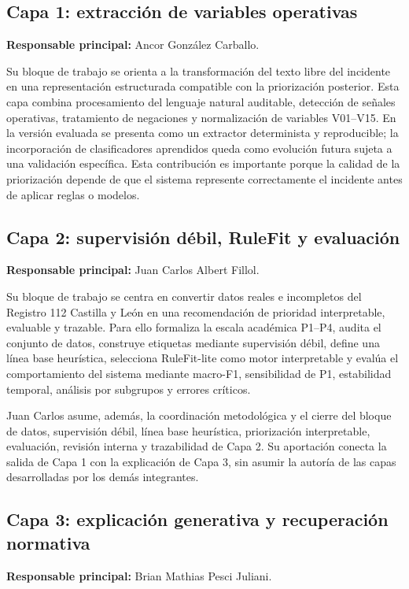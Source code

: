 \subsection{Capa 1: extracción de variables operativas}
\textbf{Responsable principal:} Ancor González Carballo.

Su bloque de trabajo se orienta a la transformación del texto libre del incidente en una representación estructurada compatible con la priorización posterior. Esta capa combina procesamiento del lenguaje natural auditable, detección de señales operativas, tratamiento de negaciones y normalización de variables V01--V15. En la versión evaluada se presenta como un extractor determinista y reproducible; la incorporación de clasificadores aprendidos queda como evolución futura sujeta a una validación específica. Esta contribución es importante porque la calidad de la priorización depende de que el sistema represente correctamente el incidente antes de aplicar reglas o modelos.

\subsection{Capa 2: supervisión débil, RuleFit y evaluación}
\textbf{Responsable principal:} Juan Carlos Albert Fillol.

Su bloque de trabajo se centra en convertir datos reales e incompletos del Registro 112 Castilla y León en una recomendación de prioridad interpretable, evaluable y trazable. Para ello formaliza la escala académica P1--P4, audita el conjunto de datos, construye etiquetas mediante supervisión débil, define una línea base heurística, selecciona RuleFit-lite como motor interpretable y evalúa el comportamiento del sistema mediante macro-F1, sensibilidad de P1, estabilidad temporal, análisis por subgrupos y errores críticos.

Juan Carlos asume, además, la coordinación metodológica y el cierre del bloque de datos, supervisión débil, línea base heurística, priorización interpretable, evaluación, revisión interna y trazabilidad de Capa 2. Su aportación conecta la salida de Capa 1 con la explicación de Capa 3, sin asumir la autoría de las capas desarrolladas por los demás integrantes.

\subsection{Capa 3: explicación generativa y recuperación normativa}
\textbf{Responsable principal:} Brian Mathias Pesci Juliani.

